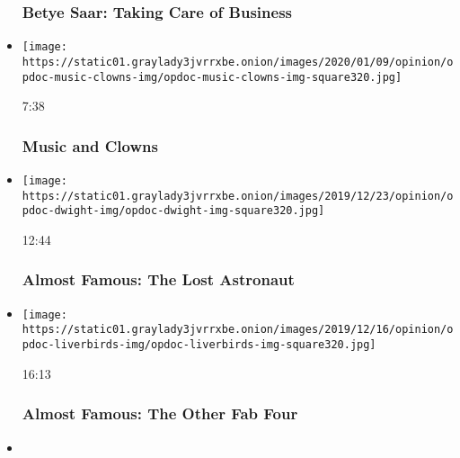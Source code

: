\begin{itemize}
  \hypertarget{betye-saar-taking-care-of-business}{%
  \subsubsection{Betye Saar: Taking Care of
  Business}\label{betye-saar-taking-care-of-business}}
\item
  \href{https://www.nytimes3xbfgragh.onion/video/opinion/100000006831435/music-and-clowns.html?action=click\&module=video-series-bar\&region=header\&pgtype=Article\&playlistId=video/op-docs}{}

  \texttt{[image: https://static01.graylady3jvrrxbe.onion/images/2020/01/09/opinion/opdoc-music-clowns-img/opdoc-music-clowns-img-square320.jpg]}

  7:38

  \hypertarget{music-and-clowns}{%
  \subsubsection{Music and Clowns}\label{music-and-clowns}}
\item
  \href{https://www.nytimes3xbfgragh.onion/video/opinion/100000006865864/almost-famous-the-lost-astronaut.html?action=click\&module=video-series-bar\&region=header\&pgtype=Article\&playlistId=video/op-docs}{}

  \texttt{[image: https://static01.graylady3jvrrxbe.onion/images/2019/12/23/opinion/opdoc-dwight-img/opdoc-dwight-img-square320.jpg]}

  12:44

  \hypertarget{almost-famous-the-lost-astronaut}{%
  \subsubsection{Almost Famous: The Lost
  Astronaut}\label{almost-famous-the-lost-astronaut}}
\item
  \href{https://www.nytimes3xbfgragh.onion/video/opinion/100000006865876/almost-famous-the-other-fab-four.html?action=click\&module=video-series-bar\&region=header\&pgtype=Article\&playlistId=video/op-docs}{}

  \texttt{[image: https://static01.graylady3jvrrxbe.onion/images/2019/12/16/opinion/opdoc-liverbirds-img/opdoc-liverbirds-img-square320.jpg]}

  16:13

  \hypertarget{almost-famous-the-other-fab-four}{%
  \subsubsection{Almost Famous: The Other Fab
  Four}\label{almost-famous-the-other-fab-four}}
\item
  \href{https://www.nytimes3xbfgragh.onion/video/opinion/100000006865878/almost-famous-kim-i-am.html?action=click\&module=video-series-bar\&region=header\&pgtype=Article\&playlistId=video/op-docs}{}


\end{itemize}
